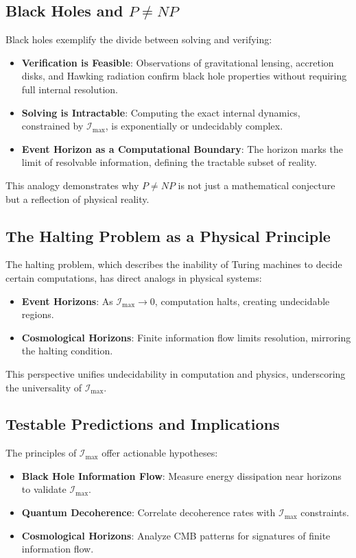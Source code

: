 \documentclass[12pt]{article}
\begin{document}
\subsection{Black Holes and \(P \neq NP\)}

Black holes exemplify the divide between solving and verifying:
\begin{itemize}
    \item \textbf{Verification is Feasible}: Observations of gravitational lensing, accretion disks, and Hawking radiation confirm black hole properties without requiring full internal resolution.
    \item \textbf{Solving is Intractable}: Computing the exact internal dynamics, constrained by \(\mathcal{I}_{\text{max}}\), is exponentially or undecidably complex.
    \item \textbf{Event Horizon as a Computational Boundary}: The horizon marks the limit of resolvable information, defining the tractable subset of reality.
\end{itemize}

This analogy demonstrates why \(P \neq NP\) is not just a mathematical conjecture but a reflection of physical reality.

\subsection{The Halting Problem as a Physical Principle}

The halting problem, which describes the inability of Turing machines to decide certain computations, has direct analogs in physical systems:
\begin{itemize}
    \item \textbf{Event Horizons}: As \(\mathcal{I}_{\text{max}} \to 0\), computation halts, creating undecidable regions.
    \item \textbf{Cosmological Horizons}: Finite information flow limits resolution, mirroring the halting condition.
\end{itemize}

This perspective unifies undecidability in computation and physics, underscoring the universality of \(\mathcal{I}_{\text{max}}\).

\subsection{Testable Predictions and Implications}

The principles of \(\mathcal{I}_{\text{max}}\) offer actionable hypotheses:
\begin{itemize}
    \item \textbf{Black Hole Information Flow}: Measure energy dissipation near horizons to validate \(\mathcal{I}_{\text{max}}\).
    \item \textbf{Quantum Decoherence}: Correlate decoherence rates with \(\mathcal{I}_{\text{max}}\) constraints.
    \item \textbf{Cosmological Horizons}: Analyze CMB patterns for signatures of finite information flow.
\end{itemize}
\end{document}
